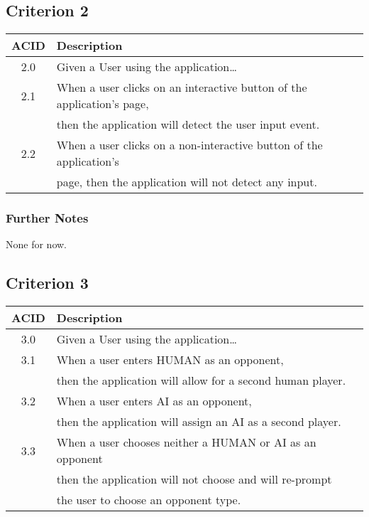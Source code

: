 \documentclass[11pt]{article}
\begin{document}
\subsection*{Criterion 2}
\label{sec:org6537254}
\begin{center}
\begin{tabular}{|c|l|}
ACID & Description\\
\hline
2.0 & Given a User using the application\ldots{}\\
\hline
2.1 & When a user clicks on an interactive button of the application's page,\\
 & then the application will detect the user input event.\\
2.2 & When a user clicks on a non-interactive button of the application's\\
 & page, then the application will not detect any input.\\
\end{tabular}
\end{center}

\subsubsection*{Further Notes}
\label{sec:org00ada5d}
None for now.

\subsection{Criterion 3}
\label{sec:org1ef7475}
\begin{center}
\begin{tabular}{|c|l|}
ACID & Description\\
\hline
3.0 & Given a User using the application\ldots{}\\
\hline
3.1 & When a user enters HUMAN as an opponent,\\
 & then the application will allow for a second human player.\\
3.2 & When a user enters AI as an opponent,\\
 & then the application will assign an AI as a second player.\\
3.3 & When a user chooses neither a HUMAN or AI as an opponent\\
 & then the application will not choose and will re-prompt\\
 & the user to choose an opponent type.\\
\end{tabular}
\end{center}
\end{document}
